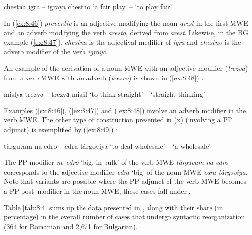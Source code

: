\documentclass[output=paper]{langsci/langscibook}
\begin{document}
\begin{exe}
\ex \label{ex:8:47}
\settowidth{}
chestna igra  – igraya chestno 
‘a fair play’ – ‘to play fair’
\end{exe}


In (\ref{ex:8:46}) \textit{preventiv} is an adjective modifying the noun \textit{arest} in the
first MWE and an adverb modifying the verb \textit{aresta}, derived from
\textit{arest}. Likewise, in the BG example (\ref{ex:8:47}), \textit{chestna} is the adjectival
modifier of \textit{igra} and \textit{chestno} is the adverb modifier of the verb
\textit{igraya}. 



An example of the derivation of a noun MWE with an adjective modifier
(\textit{trezva}) from a verb MWE with an adverb (\textit{trezvo}) is shown in (\ref{ex:8:48}) :


\begin{exe}
\ex \label{ex:8:48}
\settowidth{}
mislya trezvo – trezvа misăl 
‘to think straight’ – ‘straight thinking’
\end{exe}


Examples (\ref{ex:8:46}), (\ref{ex:8:47}) and (\ref{ex:8:48}) involve an adverb modifier in the verb MWE.
The other type of construction presented in (x) (involving a PP
adjunct) is exemplified by (\ref{ex:8:49}) :


\begin{exe}
\ex \label{ex:8:49}
\settowidth{}
tărguvam na edro – edra târgoviya 
‘to deal wholesale’ – ‘a wholesale’
\end{exe}


The PP modifier \textit{na edro} ‘big, in bulk’ of the verb MWE \textit{tărguvam na
edro} corresponds to the adjective modifier \textit{edra} ‘big’ of the noun
MWE \textit{edra târgoviya}. Note that variants are possible where the PP
adjunct of the verb MWE becomes a PP post–modifier in the noun MWE;
these cases fall under .



Table \ref{tab:8:4} sums up the data presented in , along with their share
(in percentage) in the overall number of cases that undergo syntactic
reorganization (364 for Romanian and 2,671 for Bulgarian).
\end{document}
